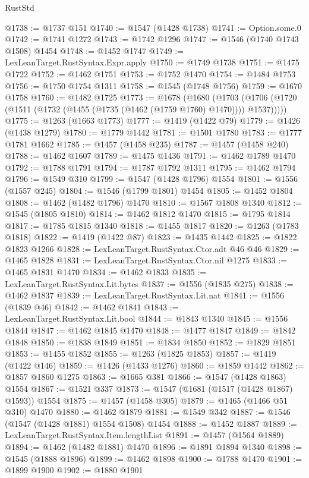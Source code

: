 \begin{lexlean}{RustStd}
\begin{coremodule}
@1738 := @1737 @151
@1740 := @1547 (@1428 @1738)
@1741 := Option.some.{0}
@1742 := @1741 @1272
@1743 := @1742 @1296
@1747 := @1546 (@1740 @1743 @1508) @1454
@1748 := @1452 @1747
@1749 := LexLeanTarget.RustSyntax.Expr.apply
@1750 := @1749 @1738
@1751 := @1475 @1722
@1752 := @1462 @1751
@1753 := @1752 @1470
@1754 := @1484 @1753
@1756 := @1750 @1754 @1311
@1758 := @1545 (@1748 @1756)
@1759 := @1670 @1758
@1760 := @1482 @1725
@1773 := @1678
    (@1680
      (@1703 (@1706 (@1720 (@1511 (@1732 (@1455 (@1735 (@1462 (@1759 @1760) @1470)))) @1537)))))
@1775 := @1263 (@1663 @1773)
@1777 := @1419 (@1422 @79)
@1779 := @1426 (@1438 @1279)
@1780 := @1779 @1442
@1781 := @1501 @1780
@1783 := @1777 @1781 @1662
@1785 := @1457 (@1458 @235)
@1787 := @1457 (@1458 @240)
@1788 := @1462 @1607
@1789 := @1475 @1436
@1791 := @1462 @1789 @1470
@1792 := @1788 @1791
@1794 := @1787 @1792 @1311
@1795 := @1462 @1794
@1796 := @1549 @310
@1799 := @1547 (@1428 @1796) @1554
@1801 := @1556 (@1557 @245)
@1804 := @1546 (@1799 @1801) @1454
@1805 := @1452 @1804
@1808 := @1462 (@1482 @1796) @1470
@1810 := @1567 @1808 @1340
@1812 := @1545 (@1805 @1810)
@1814 := @1462 @1812 @1470
@1815 := @1795 @1814
@1817 := @1785 @1815 @1340
@1818 := @1455 @1817
@1820 := @1263 (@1783 @1818)
@1822 := @1419 (@1422 @87)
@1823 := @1435 @1442
@1825 := @1822 @1823 @1266
@1828 := LexLeanTarget.RustSyntax.Ctor.adt @46 @46
@1829 := @1465 @1828
@1831 := LexLeanTarget.RustSyntax.Ctor.nil @1275
@1833 := @1465 @1831 @1470
@1834 := @1462 @1833
@1835 := LexLeanTarget.RustSyntax.Lit.bytes
@1837 := @1556 (@1835 @275)
@1838 := @1462 @1837
@1839 := LexLeanTarget.RustSyntax.Lit.nat
@1841 := @1556 (@1839 @46)
@1842 := @1462 @1841
@1843 := LexLeanTarget.RustSyntax.Lit.bool
@1844 := @1843 @1340
@1845 := @1556 @1844
@1847 := @1462 @1845 @1470
@1848 := @1477 @1847
@1849 := @1842 @1848
@1850 := @1838 @1849
@1851 := @1834 @1850
@1852 := @1829 @1851
@1853 := @1455 @1852
@1855 := @1263 (@1825 @1853)
@1857 := @1419 (@1422 @146)
@1859 := @1426 (@1433 @1276)
@1860 := @1859 @1442
@1862 := @1857 @1860 @1275
@1863 := @1665 @381
@1866 := @1547 (@1428 @1863) @1554
@1867 := @1521 @337
@1873 := @1547 (@1681 (@1517 (@1428 @1867) @1593)) @1554
@1875 := @1457 (@1458 @305)
@1879 := @1465 (@1466 @51 @310) @1470
@1880 := @1462 @1879
@1881 := @1549 @342
@1887 := @1546 (@1547 (@1428 @1881) @1554 @1508) @1454
@1888 := @1452 @1887
@1889 := LexLeanTarget.RustSyntax.Item.lengthList
@1891 := @1457 (@1564 @1889)
@1894 := @1462 (@1482 @1881) @1470
@1896 := @1891 @1894 @1340
@1898 := @1545 (@1888 @1896)
@1899 := @1462 @1898
@1900 := @1788 @1470
@1901 := @1899 @1900
@1902 := @1880 @1901

\end{coremodule}
\end{lexlean}
